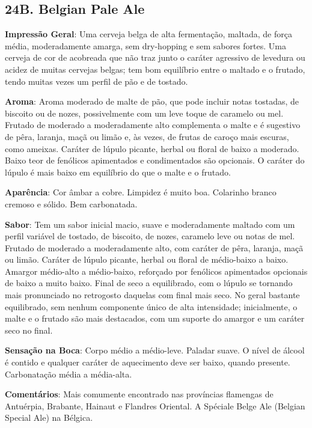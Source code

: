 \subsection*{24B. Belgian Pale Ale}
\textbf{Impressão Geral}: Uma cerveja belga de alta fermentação, maltada, de força média, moderadamente amarga, sem dry-hopping e sem sabores fortes. Uma cerveja de cor de acobreada que não traz junto o caráter agressivo de levedura ou acidez de muitas cervejas belgas; tem bom equilíbrio entre o maltado e o frutado, tendo muitas vezes um perfil de pão e de tostado.

\textbf{Aroma}: Aroma moderado de malte de pão, que pode incluir notas tostadas, de biscoito ou de nozes, possivelmente com um leve toque de caramelo ou mel. Frutado de moderado a moderadamente alto complementa o malte e é sugestivo de pêra, laranja, maçã ou limão e, às vezes, de frutas de caroço mais escuras, como ameixas. Caráter de lúpulo picante, herbal ou floral de baixo a moderado. Baixo teor de fenólicos apimentados e condimentados são opcionais. O caráter do lúpulo é mais baixo em equilíbrio do que o malte e o frutado.

\textbf{Aparência}: Cor âmbar a cobre. Limpidez é muito boa. Colarinho branco cremoso e sólido. Bem carbonatada.

\textbf{Sabor}: Tem um sabor inicial macio, suave e moderadamente maltado com um perfil variável de tostado, de biscoito, de nozes, caramelo leve ou notas de mel. Frutado de moderado a moderadamente alto, com caráter de pêra, laranja, maçã ou limão. Caráter de lúpulo picante, herbal ou floral de médio-baixo a baixo. Amargor médio-alto a médio-baixo, reforçado por fenólicos apimentados opcionais de baixo a muito baixo. Final de seco a equilibrado, com o lúpulo se tornando mais pronunciado no retrogosto daquelas com final mais seco. No geral bastante equilibrado, sem nenhum componente único de alta intensidade; inicialmente, o malte e o frutado são mais destacados, com um suporte do amargor e um caráter seco no final.

\textbf{Sensação na Boca}: Corpo médio a médio-leve. Paladar suave. O nível de álcool é contido e qualquer caráter de aquecimento deve ser baixo, quando presente. Carbonatação média a média-alta.

\textbf{Comentários}: Mais comumente encontrado nas províncias flamengas de Antuérpia, Brabante, Hainaut e Flandres Oriental. A Spéciale Belge Ale (Belgian Special Ale) na Bélgica.

